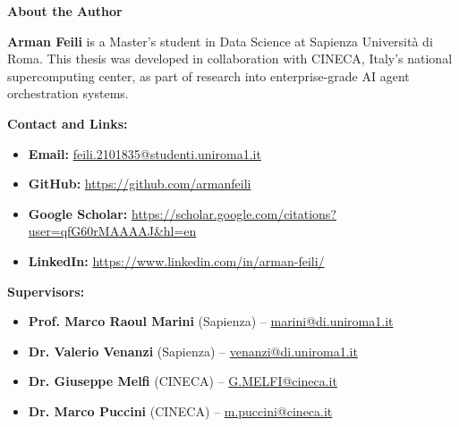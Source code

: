 \documentclass[a4paper,twoside]{sapthesis}
\begin{document}

\clearpage
\thispagestyle{empty}
\vspace*{\fill}

\begin{center}
\textbf{\Large About the Author}
\end{center}

\vspace{1cm}

\noindent
\textbf{Arman Feili} is a Master's student in Data Science at Sapienza Università di Roma. 
This thesis was developed in collaboration with CINECA, Italy's national supercomputing center, 
as part of research into enterprise-grade AI agent orchestration systems.

\vspace{1cm}

\noindent
\textbf{Contact and Links:}
\begin{itemize}
    \item \textbf{Email:} \href{mailto:feili.2101835@studenti.uniroma1.it}{feili.2101835@studenti.uniroma1.it}
    \item \textbf{GitHub:} \url{https://github.com/armanfeili}
    \item \textbf{Google Scholar:} \url{https://scholar.google.com/citations?user=qfG60rMAAAAJ&hl=en}
    \item \textbf{LinkedIn:} \url{https://www.linkedin.com/in/arman-feili/}
\end{itemize}

\vspace{1cm}

\noindent
\textbf{Supervisors:}
\begin{itemize}
    \item \textbf{Prof. Marco Raoul Marini} (Sapienza) -- \href{mailto:marini@di.uniroma1.it}{marini@di.uniroma1.it}
    \item \textbf{Dr. Valerio Venanzi} (Sapienza) -- \href{mailto:venanzi@di.uniroma1.it}{venanzi@di.uniroma1.it}
    \item \textbf{Dr. Giuseppe Melfi} (CINECA) -- \href{mailto:G.MELFI@cineca.it}{G.MELFI@cineca.it}
    \item \textbf{Dr. Marco Puccini} (CINECA) -- \href{mailto:m.puccini@cineca.it}{m.puccini@cineca.it}
\end{itemize}

\vspace*{\fill}
\end{document}
